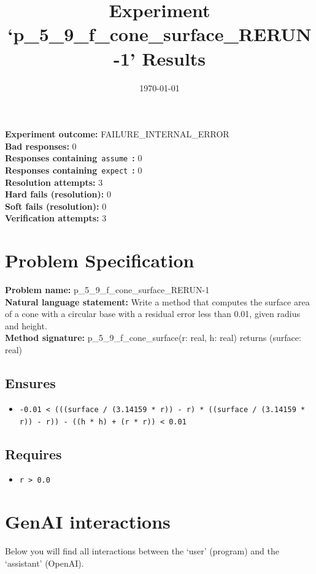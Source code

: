 \documentclass{article}
\begin{document}
\title{Experiment `p\_5\_9\_f\_cone\_surface\_RERUN-1' Results}
\author{\today}
\date{}
\maketitle
\textbf{Experiment outcome: }FAILURE\_INTERNAL\_ERROR
\\\textbf{Bad responses: }0
\\\textbf{Responses containing}~\texttt{assume}~\textbf{: }0
\\\textbf{Responses containing}~\texttt{expect}~\textbf{: }0
\\\textbf{Resolution attempts: }3
\\\textbf{Hard fails (resolution): }0
\\\textbf{Soft fails (resolution): }0
\\\textbf{Verification attempts: }3
\section*{Problem Specification}
\textbf{Problem name: }p\_5\_9\_f\_cone\_surface\_RERUN-1
\\\textbf{Natural language statement: }Write a method that computes the surface area of a cone with a circular base with a residual error less than 0.01, given radius and height.
\\\textbf{Method signature: }p\_5\_9\_f\_cone\_surface(r: real, h: real) returns (surface: real)
\subsection*{Ensures}
\begin{itemize}
\item \texttt{-0.01 < (((surface / (3.14159 * r)) - r) * ((surface / (3.14159 * r)) - r)) - ((h * h) + (r * r)) < 0.01}
\end{itemize}
\subsection*{Requires}
\begin{itemize}
\item \texttt{r > 0.0}
\end{itemize}
\clearpage
\section*{GenAI interactions}
Below you will find all interactions between the `user' (program) and the `assistant' (OpenAI).
\end{document}
